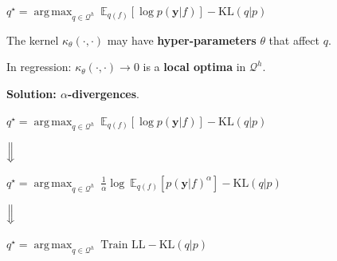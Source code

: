 \documentclass[aspectratio=149]{beamer}
\DeclareMathOperator*{\argmax}{arg\,max}
\begin{document}
    \begin{frame}
    \begin{HighlightBoxFit}
        \(q^\star = \argmax_{q \in \mathcal{Q}^h}\ \mathbb{E}_{q(f)} \left[ \log p(\mathbf{y}|f)\right] - \text{KL}\left(q|p\right)\)
    \end{HighlightBoxFit}
    \pause
    \begin{center}
    The kernel \(\kappa_\theta(\cdot, \cdot)\) may have \textbf{hyper-parameters }\(\theta\) that affect \(q\).
    \end{center}
    \pause
    \begin{center}
        In regression: \(\kappa_{\theta}(\cdot, \cdot) \to 0\) is a \textbf{local optima} in \(\mathcal{Q}^h\).
    \end{center}
    \pause
    \begin{center}
        \textbf{Solution: \(\alpha\)-divergences}.
    \end{center}
    \end{frame}
    \begin{frame}
    \begin{HighlightBoxFit}
        \(q^\star = \argmax_{q \in \mathcal{Q}^h}\ \mathbb{E}_{q(f)} \left[ \log p(\mathbf{y}|f)\right] - \text{KL}\left(q|p\right)\)
    \end{HighlightBoxFit}
    \pause
    \vspace{-0.5cm}
    \begin{center}
          \(\Big\Downarrow\)  
    \end{center}
    \vspace{-0.5cm}
    \begin{HighlightBoxFit}
        \(q^\star = \argmax_{q \in \mathcal{Q}^h}\ \tfrac{1}{\alpha}\log \ \mathbb{E}_{q(f)} \left[  p(\mathbf{y}|f)^{\alpha}\right] - \text{KL}\left(q|p\right)\)
    \end{HighlightBoxFit}
    \pause 
    \vspace{-0.5cm}
    \begin{center}
          \(\Big\Downarrow\)  
    \end{center}
    \vspace{-0.5cm}
    \begin{HighlightBoxFit}
        \(q^\star = \argmax_{q \in \mathcal{Q}^h} \ \text{Train LL} - \text{KL}\left(q| p\right)\)
    \end{HighlightBoxFit}
    \end{frame}
    
\end{document}

